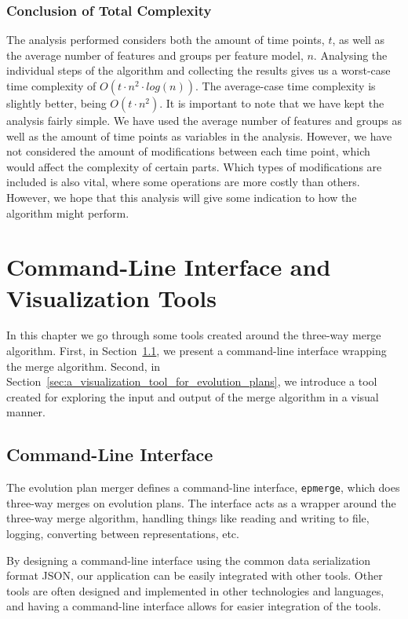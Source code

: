 \documentclass[a4paper,english]{ifimaster}
\begin{document}
\subsection*{Conclusion of Total Complexity}%
\label{sub:conclusion_of_total_complexity}

The analysis performed considers both the amount of time points, $t$, as well as the average number of features and groups per feature model, $n$. Analysing the individual steps of the algorithm and collecting the results gives us a worst-case time complexity of $O(t \cdot n^2 \cdot log(n))$. The average-case time complexity is slightly better, being $O(t \cdot n^2)$. It is important to note that we have kept the analysis fairly simple. We have used the average number of features and groups as well as the amount of time points as variables in the analysis. However, we have not considered the amount of modifications between each time point, which would affect the complexity of certain parts. Which types of modifications are included is also vital, where some operations are more costly than others. However, we hope that this analysis will give some indication to how the algorithm might perform.

\chapter{Command-Line Interface and Visualization Tools}%
\label{cha:command_line_interface_and_visualization_tools}

In this chapter we go through some tools created around the three-way merge algorithm. First, in Section~\ref{sec:command_line_interface}, we present a command-line interface wrapping the merge algorithm. Second, in Section~\ref{sec:a_visualization_tool_for_evolution_plans}, we introduce a tool created for exploring the input and output of the merge algorithm in a visual manner.

\section{Command-Line Interface}%
\label{sec:command_line_interface}

The evolution plan merger defines a command-line interface, \texttt{epmerge}, which does three-way merges on evolution plans. The interface acts as a wrapper around the three-way merge algorithm, handling things like reading and writing to file, logging, converting between representations, etc. 

By designing a command-line interface using the common data serialization format JSON, our application can be easily integrated with other tools. Other tools are often designed and implemented in other technologies and languages, and having a command-line interface allows for easier integration of the tools.
\end{document}
